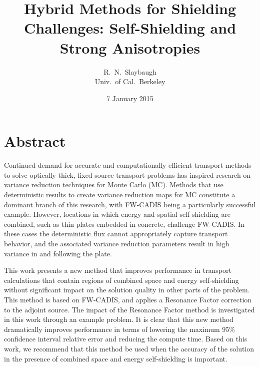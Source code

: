 \documentclass[12pt]{article}
\title{Hybrid Methods for Shielding Challenges: Self-Shielding and Strong Anisotropies}
\author{R.\ N.\ Slaybaugh \\ Univ.\ of Cal.\ Berkeley}
\date{7 January 2015}
\begin{document}
\maketitle

\section*{Abstract}

Continued demand for accurate and computationally efficient transport methods to solve optically thick, fixed-source transport problems has inspired research on variance reduction techniques for Monte Carlo (MC). Methods that use deterministic results to create variance reduction maps for MC constitute a dominant branch of this research, with FW-CADIS being a particularly successful example. However, locations in which energy and spatial self-shielding are combined, such as thin plates embedded in concrete, challenge FW-CADIS. In these cases the deterministic flux cannot appropriately capture transport behavior, and the associated variance reduction parameters result in high variance in and following the plate. 

This work presents a new method that improves performance in transport calculations that contain regions of combined space and energy self-shielding without significant impact on the solution quality in other parts of the problem. This method is based on FW-CADIS, and applies a Resonance Factor correction to the adjoint source. The impact of the Resonance Factor method is investigated in this work through an example problem. It is clear that this new method dramatically improves performance in terms of lowering the maximum 95\% confidence interval relative error and reducing the compute time. Based on this work, we recommend that this method be used when the accuracy of the solution in the presence of combined space and energy self-shielding is important.


%
\end{document}
